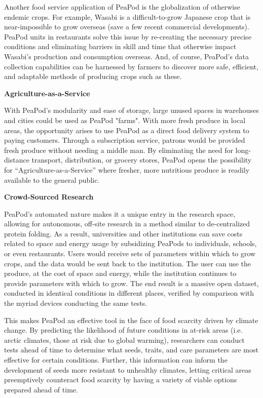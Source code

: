 \documentclass{report}
\begin{document}
Another food service application of PeaPod is the globalization of otherwise endemic crops. For example, Wasabi is a difficult-to-grow Japanese crop that is near-impossible to grow overseas (save a few recent commercial developments). PeaPod units in restaurants solve this issue by re-creating the necessary precise conditions and eliminating barriers in skill and time that otherwise impact Wasabi's production and consumption overseas. And, of course, PeaPod's data collection capabilities can be harnessed by farmers to discover more safe, efficient, and adaptable methods of producing crops such as these.

\textbf{Agriculture-as-a-Service}

With PeaPod’s modularity and ease of storage, large unused spaces in warehouses and cities could be used as PeaPod "farms". With more fresh produce in local areas, the opportunity arises to use PeaPod as a direct food delivery system to paying customers. Through a subscription service, patrons would be provided fresh produce without needing a middle man. By eliminating the need for long-distance transport, distribution, or grocery stores, PeaPod opens the possibility for “Agriculture-as-a-Service” where fresher, more nutritious produce is readily available to the general public.

\textbf{Crowd-Sourced Research} %

PeaPod's automated nature makes it a unique entry in the research space, allowing for autonomous, off-site research in a method similar to de-centralized protein folding. As a result, universities and other institutions can save costs related to space and energy usage by subsidizing PeaPods to individuals, schools, or even restaurants. Users would receive sets of parameters within which to grow crops, and the data would be sent back to the institution. The user can use the produce, at the cost of space and energy, while the institution continues to provide parameters with which to grow. The end result is a massive open dataset, conducted in identical conditions in different places, verified by comparison with the myriad devices conducting the same tests.

This makes PeaPod an effective tool in the face of food scarcity driven by climate change. By predicting the likelihood of future conditions in at-risk areas (i.e. arctic climates, those at risk due to global warming), researchers can conduct tests ahead of time to determine what seeds, traits, and care parameters are most effective for certain conditions. Further, this information can inform the development of seeds more resistant to unhealthy climates, letting critical areas preemptively counteract food scarcity by having a variety of viable options prepared ahead of time.
\end{document}
